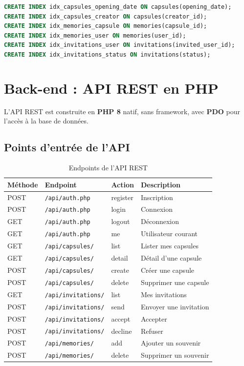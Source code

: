 \documentclass[12pt,a4paper]{report}
\begin{document}
\begin{lstlisting}[language=SQL, caption={Index créés pour accélérer les requêtes}]
CREATE INDEX idx_capsules_opening_date ON capsules(opening_date);
CREATE INDEX idx_capsules_creator ON capsules(creator_id);
CREATE INDEX idx_memories_capsule ON memories(capsule_id);
CREATE INDEX idx_memories_user ON memories(user_id);
CREATE INDEX idx_invitations_user ON invitations(invited_user_id);
CREATE INDEX idx_invitations_status ON invitations(status);
\end{lstlisting}


\section{Back-end : API REST en PHP}

L'API REST est construite en \textbf{PHP 8} natif, sans framework, avec \textbf{PDO} pour l'accès à la base de données.

\subsection{Points d'entrée de l'API}

\begin{table}[H]
    \centering
    \begin{tabularx}{\textwidth}{l l l X}
        \toprule
        \textbf{Méthode} & \textbf{Endpoint} & \textbf{Action} & \textbf{Description} \\
        \midrule
        POST & \texttt{/api/auth.php} & register & Inscription \\
        POST & \texttt{/api/auth.php} & login & Connexion \\
        GET  & \texttt{/api/auth.php} & logout & Déconnexion \\
        GET  & \texttt{/api/auth.php} & me & Utilisateur courant \\
        \midrule
        GET  & \texttt{/api/capsules/} & list & Lister mes capsules \\
        GET  & \texttt{/api/capsules/} & detail & Détail d'une capsule \\
        POST & \texttt{/api/capsules/} & create & Créer une capsule \\
        POST & \texttt{/api/capsules/} & delete & Supprimer une capsule \\
        \midrule
        GET  & \texttt{/api/invitations/} & list & Mes invitations \\
        POST & \texttt{/api/invitations/} & send & Envoyer une invitation \\
        POST & \texttt{/api/invitations/} & accept & Accepter \\
        POST & \texttt{/api/invitations/} & decline & Refuser \\
        \midrule
        POST & \texttt{/api/memories/} & add & Ajouter un souvenir \\
        POST & \texttt{/api/memories/} & delete & Supprimer un souvenir \\
        \bottomrule
    \end{tabularx}
    \caption{Endpoints de l'API REST}
\end{table}
\end{document}
